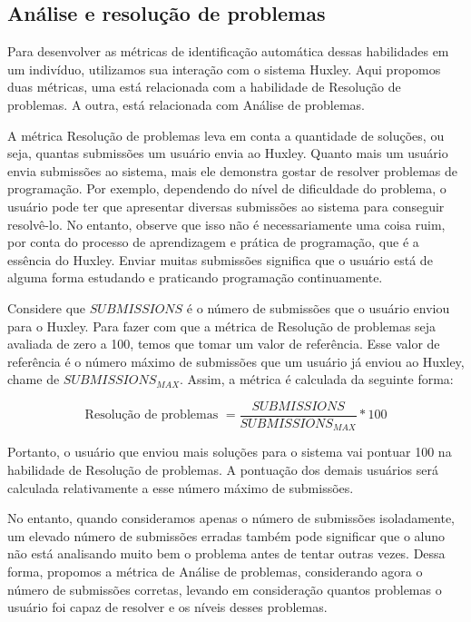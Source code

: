 \subsection{Análise e resolução de problemas}

Para desenvolver as métricas de identificação automática dessas habilidades em um indivíduo, utilizamos sua interação com o sistema Huxley. Aqui propomos duas métricas, uma está relacionada com a habilidade de Resolução de problemas. A outra, está relacionada com Análise de problemas.

A métrica Resolução de problemas leva em conta a quantidade de soluções, ou seja, quantas submissões um usuário envia ao Huxley. Quanto mais um usuário envia submissões ao sistema, mais ele demonstra gostar de resolver problemas de programação. Por exemplo, dependendo do nível de dificuldade do problema, o usuário pode ter que apresentar diversas submissões ao sistema para conseguir resolvê-lo. No entanto, observe que isso não é necessariamente uma coisa ruim, por conta do processo de aprendizagem e prática de programação, que é a essência do Huxley. Enviar muitas submissões significa que o usuário está de alguma forma estudando e praticando programação continuamente.

Considere que $SUBMISSIONS$ é o número de submissões que o usuário enviou para o Huxley. 
Para fazer com que a métrica de Resolução de problemas seja avaliada de zero a 100, temos que tomar um valor de referência. Esse valor de referência é o número máximo de submissões que um usuário já enviou ao Huxley, chame de $SUBMISSIONS_{MAX}$. Assim, a métrica é calculada da seguinte forma:

\begin{equation} \label{m:resolucao}
\mbox{Resolução de problemas } = \frac{SUBMISSIONS}{SUBMISSIONS_{MAX}} * 100
\end{equation}

Portanto, o usuário que enviou mais soluções para o sistema vai pontuar 100 na habilidade de Resolução de problemas. A pontuação dos demais usuários será calculada relativamente a esse número máximo de submissões.

No entanto, quando consideramos apenas o número de submissões isoladamente, um elevado número de submissões erradas também pode significar que o aluno não está analisando muito bem o problema antes de tentar outras vezes. Dessa forma, propomos a métrica de Análise de problemas, considerando agora o número de submissões corretas, levando em consideração quantos problemas o usuário foi capaz de resolver e os níveis desses problemas.

